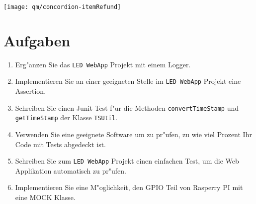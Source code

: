 \begin{centering}
\texttt{[image: qm/concordion-itemRefund]}
\end{centering}
%

\section{Aufgaben}
\begin{enumerate}
\item Erg"anzen Sie das \verb|LED WebApp| Projekt mit einem Logger.
\item Implementieren Sie an einer geeigneten Stelle im \verb|LED WebApp| Projekt
eine Assertion.
\item Schreiben Sie einen Junit Test f"ur die Methoden \verb|convertTimeStamp| und
\verb|getTimeStamp| der Klasse \verb|TSUtil|.
\item Verwenden Sie eine geeignete Software um zu pr"ufen, zu wie viel Prozent Ihr
Code mit Tests abgedeckt ist.
\item Schreiben Sie zum \verb|LED WebApp| Projekt einen einfachen Test, um die Web Applikation
automatisch zu pr"ufen.
\item Implementieren Sie eine M"oglichkeit, den GPIO Teil von Rasperry PI mit eine MOCK Klasse.
\end{enumerate}

\newslide
